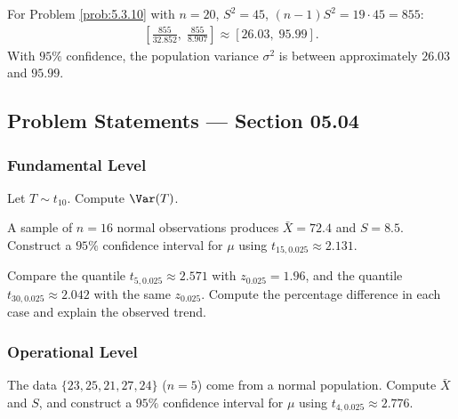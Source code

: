 \begin{solucion}
	\label{sol:5.3.10}
	For Problem \ref{prob:5.3.10} with $n=20$, $S^2=45$, $(n-1)S^2 = 19\cdot 45 = 855$:
	\begin{align*}
		\left[\frac{855}{32.852},\; \frac{855}{8.907}\right] \approx [26.03,\; 95.99].
	\end{align*}
	With $95\%$ confidence, the population variance $\sigma^2$ is between approximately $26.03$ and $95.99$. \quad \qedhere
\end{solucion}


\subsection*{Problem Statements --- Section 05.04}

\subsubsection*{Fundamental Level}

\begin{problema}
	\label{prob:5.4.1}
	Let $T \sim t_{10}$. Compute $\Var(T)$.
\end{problema}

\begin{problema}
	\label{prob:5.4.2}
	A sample of $n=16$ normal observations produces $\bar X=72.4$ and $S=8.5$. Construct a $95\%$ confidence interval for $\mu$ using $t_{15,0.025}\approx 2.131$.
\end{problema}

\begin{problema}
	\label{prob:5.4.3}
	Compare the quantile $t_{5,0.025}\approx 2.571$ with $z_{0.025}=1.96$, and the quantile $t_{30,0.025}\approx 2.042$ with the same $z_{0.025}$. Compute the percentage difference in each case and explain the observed trend.
\end{problema}

\subsubsection*{Operational Level}

\begin{problema}
	\label{prob:5.4.4}
	The data $\{23, 25, 21, 27, 24\}$ ($n=5$) come from a normal population. Compute $\bar X$ and $S$, and construct a $95\%$ confidence interval for $\mu$ using $t_{4,0.025}\approx 2.776$.
\end{problema}

